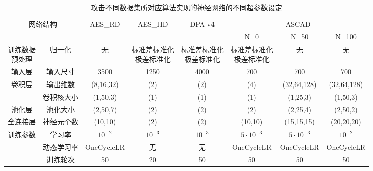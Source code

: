 {	\begin{table}[!htb]
		\label{tab:cnnhyperpara}
		\scriptsize{
			\centering
			\begin{subtable}[t]{\textwidth}
				\caption{攻击不同数据集所对应算法实现的神经网络的不同超参数设定}
				\centering
				\begin{tabular}{cc|cccccc}
					\hline
					\multicolumn{2}{c|}{\multirow{2}{*}{网络结构}} &\multirow{2}{*}{AES\_RD}&\multirow{2}{*}{AES\_HD}&\multirow{2}{*}{DPA v4}& \multicolumn{3}{c}{ASCAD} \\
					\multicolumn{2}{c|}{}&&&&N=0 & N=50 & N=100 \\
					\hline
					\hline
					\shortstack{训练数据\\预处理}      &归一化        &无&\shortstack{标准差标准化\\极差标准化}&\shortstack{标准差标准化\\极差标准化}&\shortstack{标准差标准化\\极差标准化}&无&无\\
					\hline
					\multirow{1}{*}{输入层}           &输入尺寸       &3500        &1250       &4000         &700                &700                &700               \\
					\hline               
					\multirow{2}{*}{卷积层 }          &输出维数       &(8,16,32)   &(2)        &(2)          &(4)                &(32,64,128)        &(32,64,128)        \\
					                                  &卷积核大小     &(1,50,3)    &(1)        &(1)          &(1)                &(1,25,3)           &(1,50,3)        \\
					\hline               
					\multirow{1}{*}{池化层 }          &池化大小       &(2,50,7)    &(2)        &(2)          &(2)                &(2,25,4)           &(2,50,2)        \\
					\hline               
					\multirow{1}{*}{全连接层}         &神经元个数     &(10,10)     &(2)        &(2)          &(10,10)            &(15,15,15)         &(20,20,20)          \\
					\hline          
					\multirow{3}{*}{训练参数}          &学习率        &$10^{-2}$   &$10^{-3}$  &$10^{-3}$    &$5\cdot10^{-3}$    &$5\cdot10^{-3}$    &$10^{-2}$         \\
					                                  &动态学习率    &OneCycleLR  &无         &无           &OneCycleLR         &OneCycleLR         &OneCycleLR           \\
					                                  &训练轮次      &50           &20         &50           &50                 &50                 &50                      \\
					\hline          
					

\end{tabular}
\end{subtable}}
\end{table}}
